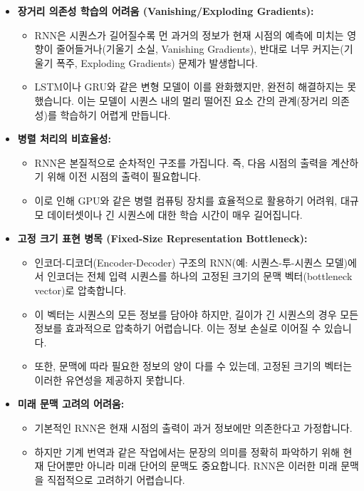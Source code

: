 \documentclass[11pt,a4paper]{article}
\begin{document}
\begin{warningbox}[title={RNN의 주요 한계점}]
\begin{itemize}
    \item \textbf{장거리 의존성 학습의 어려움 (Vanishing/Exploding Gradients):}
    \begin{itemize}
        \item RNN은 시퀀스가 길어질수록 먼 과거의 정보가 현재 시점의 예측에 미치는 영향이 줄어들거나(기울기 소실, Vanishing Gradients), 반대로 너무 커지는(기울기 폭주, Exploding Gradients) 문제가 발생합니다.
        \item LSTM이나 GRU와 같은 변형 모델이 이를 완화했지만, 완전히 해결하지는 못했습니다. 이는 모델이 시퀀스 내의 멀리 떨어진 요소 간의 관계(장거리 의존성)를 학습하기 어렵게 만듭니다.
    \end{itemize}
    \item \textbf{병렬 처리의 비효율성:}
    \begin{itemize}
        \item RNN은 본질적으로 순차적인 구조를 가집니다. 즉, 다음 시점의 출력을 계산하기 위해 이전 시점의 출력이 필요합니다.
        \item 이로 인해 GPU와 같은 병렬 컴퓨팅 장치를 효율적으로 활용하기 어려워, 대규모 데이터셋이나 긴 시퀀스에 대한 학습 시간이 매우 길어집니다.
    \end{itemize}
    \item \textbf{고정 크기 표현 병목 (Fixed-Size Representation Bottleneck):}
    \begin{itemize}
        \item 인코더-디코더(Encoder-Decoder) 구조의 RNN(예: 시퀀스-투-시퀀스 모델)에서 인코더는 전체 입력 시퀀스를 하나의 고정된 크기의 문맥 벡터(bottleneck vector)로 압축합니다.
        \item 이 벡터는 시퀀스의 모든 정보를 담아야 하지만, 길이가 긴 시퀀스의 경우 모든 정보를 효과적으로 압축하기 어렵습니다. 이는 정보 손실로 이어질 수 있습니다.
        \item 또한, 문맥에 따라 필요한 정보의 양이 다를 수 있는데, 고정된 크기의 벡터는 이러한 유연성을 제공하지 못합니다.
    \end{itemize}
    \item \textbf{미래 문맥 고려의 어려움:}
    \begin{itemize}
        \item 기본적인 RNN은 현재 시점의 출력이 과거 정보에만 의존한다고 가정합니다.
        \item 하지만 기계 번역과 같은 작업에서는 문장의 의미를 정확히 파악하기 위해 현재 단어뿐만 아니라 미래 단어의 문맥도 중요합니다. RNN은 이러한 미래 문맥을 직접적으로 고려하기 어렵습니다.
    \end{itemize}
\end{itemize}
\end{warningbox}
\end{document}
